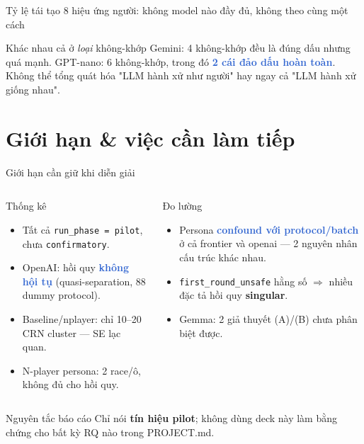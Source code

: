 \documentclass[9pt,aspectratio=169]{beamer}
\newcommand{\bad}[1]{\textcolor{highlight}{\textbf{#1}}}
\begin{document}
\begin{frame}{Tỷ lệ tái tạo 8 hiệu ứng người: không model nào đầy đủ, không theo cùng một cách}
\centering
{}
\begin{exampleblock}{Khác nhau cả ở \textit{loại} không-khớp}
\small Gemini: 4 không-khớp đều là đúng dấu nhưng quá mạnh. GPT-nano: 6 không-khớp, trong đó \bad{2 cái đảo dấu hoàn toàn}. Không thể tổng quát hóa "LLM hành xử như người" hay ngay cả "LLM hành xử giống nhau".
\end{exampleblock}
\end{frame}

\section{Giới hạn \& việc cần làm tiếp}

\begin{frame}{Giới hạn cần giữ khi diễn giải}
\begin{columns}[T]
\begin{alertblock}{Thống kê}
\small
\begin{itemize}\setlength\itemsep{2pt}
\item Tất cả \texttt{run\_phase = pilot}, chưa \texttt{confirmatory}.
\item OpenAI: hồi quy \bad{không hội tụ} (quasi-separation, 88 dummy protocol).
\item Baseline/nplayer: chỉ 10--20 CRN cluster --- SE lạc quan.
\item N-player persona: 2 race/ô, không đủ cho hồi quy.
\end{itemize}
\end{alertblock}
\begin{alertblock}{Đo lường}
\small
\begin{itemize}\setlength\itemsep{2pt}
\item Persona \bad{confound với protocol/batch} ở cả frontier và openai --- 2 nguyên nhân cấu trúc khác nhau.
\item \texttt{first\_round\_unsafe} hằng số $\Rightarrow$ nhiều đặc tả hồi quy \textbf{singular}.
\item Gemma: 2 giả thuyết (A)/(B) chưa phân biệt được.
\end{itemize}
\end{alertblock}
\end{columns}
\vspace{0.4em}
\begin{exampleblock}{Nguyên tắc báo cáo}
\small Chỉ nói \textbf{tín hiệu pilot}; không dùng deck này làm bằng chứng cho bất kỳ RQ nào trong PROJECT.md.
\end{exampleblock}
\end{frame}
\end{document}
